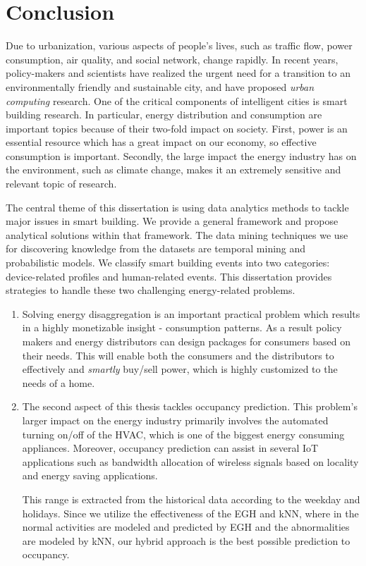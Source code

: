 \chapter{Conclusion}
Due to urbanization, various aspects of people's lives, such as traffic flow, power consumption, air quality, and social network, change rapidly. In recent years, policy-makers and scientists have realized the urgent need for a transition to an environmentally friendly and sustainable city, and have proposed \emph{urban computing} research. One of the critical components of intelligent cities is smart building research. In particular, energy distribution and consumption are important topics because of their two-fold impact on society. First, power is an essential resource which has a great impact on our economy, so effective consumption is important. Secondly, the large impact the energy industry has on the environment, such as climate change, makes it an extremely sensitive and relevant topic of research. 

The central theme of this dissertation is using data analytics methods to tackle major issues in smart building. We provide a general framework and propose analytical solutions within that framework. The data mining techniques we use for discovering knowledge from the datasets are temporal mining and probabilistic models. We classify smart building events into two categories: device-related profiles and human-related events. This dissertation provides strategies to handle these two challenging energy-related problems. 


\iffalse
\begin{enumerate}
\item 


Solving energy disaggregation is an important practical problem which results in a highly monetizable insight - consumption patterns. As a result policy makers and energy distributors can design packages for consumers based on their needs. This will enable both the consumers and the distributors to effectively and \emph{smartly} buy/sell power, which is highly customized to the needs of a home.

\item 
The second aspect of this thesis tackles occupancy prediction. This problem's larger impact on the energy industry primarily involves the automated turning on/off of the HVAC, which is one of the biggest energy consuming appliances. Moreover, occupancy prediction can assist in several IoT applications such as bandwidth allocation of wireless signals based on locality and energy saving applications.


This range is extracted from the historical data according to the weekday and holidays. Since we utilize the effectiveness of the EGH and kNN, where in the normal activities are modeled and predicted by EGH and the abnormalities are modeled by kNN, our hybrid approach is the best possible prediction to occupancy.
\end{enumerate}


